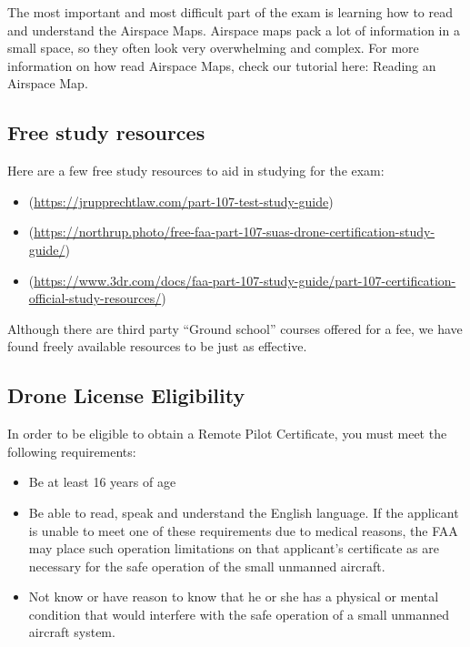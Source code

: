 \documentclass[
  12pt,
]{book}
\providecommand{\tightlist}{%
  \setlength{\itemsep}{0pt}\setlength{\parskip}{0pt}}
\newenvironment{notebox}{
  \definecolor{shadecolor}{gray}{.8}  %
  \color{black}
  \begin{shaded}}
 {\end{shaded}}
\begin{document}
The most important and most difficult part of the exam is learning how to read and understand the Airspace Maps. Airspace maps pack a lot of information in a small space, so they often look very overwhelming and complex. For more information on how read Airspace Maps, check our tutorial here: Reading an Airspace Map.

\hypertarget{free-study-resources}{%
\subsection{Free study resources}\label{free-study-resources}}

Here are a few free study resources to aid in studying for the exam:

\begin{itemize}
\tightlist
\item
  (\url{https://jrupprechtlaw.com/part-107-test-study-guide})
\item
  (\url{https://northrup.photo/free-faa-part-107-suas-drone-certification-study-guide/})
\item
  (\url{https://www.3dr.com/docs/faa-part-107-study-guide/part-107-certification-official-study-resources/})
\end{itemize}

\begin{notebox}
Although there are third party ``Ground school'' courses offered for a fee, we have found freely available resources to be just as effective.

\end{notebox}

\hypertarget{drone-license-eligibility}{%
\subsection{Drone License Eligibility}\label{drone-license-eligibility}}

In order to be eligible to obtain a Remote Pilot Certificate, you must meet the following requirements:

\begin{itemize}
\tightlist
\item
  Be at least 16 years of age
\item
  Be able to read, speak and understand the English language. If the applicant is unable to meet one of these requirements due to medical reasons, the FAA may place such operation limitations on that applicant's certificate as are necessary for the safe operation of the small unmanned aircraft.
\item
  Not know or have reason to know that he or she has a physical or mental condition that would interfere with the safe operation of a small unmanned aircraft system.
\end{itemize}
\end{document}
